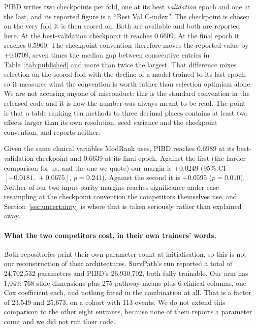 \documentclass[unnumsec,webpdf,contemporary,large]{oup-authoring-template}
\begin{document}
PIBD writes two checkpoints per fold, one at its best \emph{validation} epoch and one at the last,
and its reported figure is a ``Best Val C-index''. The checkpoint is chosen on the very fold it is
then scored on. Both are available and both are reported here. At the best-validation
checkpoint it reaches 0.6609. At the final epoch it reaches 0.5900. The checkpoint convention
therefore moves the reported value by $+0.0709$, seven times the median gap between consecutive
entries in Table~\ref{tab:published} and more than twice the largest. That difference mixes
selection on the scored fold with the decline of a model trained to its last epoch, so it measures
what the convention is worth rather than selection optimism alone. We are not accusing anyone of misconduct: this is the
standard convention in the released code and it is how the number was always meant to be read. The
point is that a table ranking ten methods to three decimal places contains at least two effects
larger than its own resolution, seed variance and the checkpoint convention, and reports neither.

Given the same clinical variables ModRank uses, PIBD reaches 0.6989 at its best-validation
checkpoint and 0.6639 at its final epoch. Against the first (the harder comparison for us, and the one we quote) our margin is +0.0249 (95\% CI $[-0.0181,\,+0.0675]$, $p=0.241$). Against the second it is $+0.0595$ ($p=0.010$). Neither of our two input-parity margins reaches
significance under case resampling at the checkpoint convention the competitors themselves use,
and Section~\ref{sec:uncertainty} is where that is taken seriously rather than explained away.

\paragraph{What the two competitors cost, in their own trainers' words.} Both repositories print
their own parameter count at initialisation, so this is not our reconstruction of their
architectures. SurvPath's run reported a total of 24{,}702{,}532 parameters and PIBD's
26{,}930{,}702, both fully trainable. Our arm has 1{,}049: 768 slide dimensions plus
275 pathway means plus 6 clinical columns, one Cox coefficient each, and nothing fitted in
the combination at all. That is a factor of 23{,}549 and 25{,}673, on a cohort
with 113 events. We do not extend this comparison to the other eight entrants, because none of them
reports a parameter count and we did not run their code.
\end{document}
